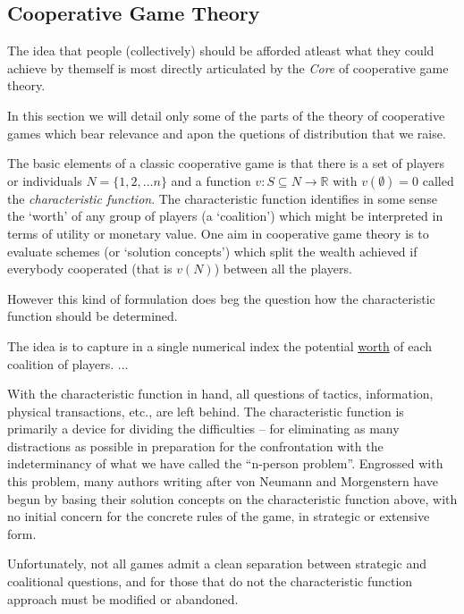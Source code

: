 \subsection{Cooperative Game Theory}\label{sec:cooperative_game_theory_part}

The idea that people (collectively) should be afforded atleast what they could achieve by themself is most directly articulated by the \textit{Core} of cooperative game theory.

In this section we will detail only some of the parts of the theory of cooperative games which bear relevance and apon the quetions of distribution that we raise.

The basic elements of a classic cooperative game is that there is a set of players or individuals $N=\{1,2,\dots n\}$ and a function $v: S\subseteq N \rightarrow \mathbb{R}$ with $v(\emptyset)=0$ called the \textit{characteristic function}.
The characteristic function identifies in some sense the `worth' of any group of players (a `coalition') which might be interpreted in terms of utility or monetary value.
One aim in cooperative game theory is to evaluate schemes (or `solution concepts') which split the wealth achieved if everybody cooperated (that is $v(N)$) between all the players.

However this kind of formulation does beg the question how the characteristic function should be determined.

\begin{displayquote}
The idea is to capture in a single numerical index the potential \underline{worth} of each coalition of players.
...

With the characteristic function in hand, all questions of tactics, information, physical transactions, etc., are left behind. The characteristic function is primarily a device for dividing the difficulties -- for eliminating as many distractions as possible in preparation for the confrontation with the indeterminancy of what we have called the ``n-person problem''. Engrossed with this problem, many authors writing after von Neumann and Morgenstern have begun by basing their solution concepts on the characteristic function above, with no initial concern for the concrete rules of the game, in strategic or extensive form.

Unfortunately, not all games admit a clean separation between strategic and coalitional questions, and for those that do not the characteristic function approach must be modified or abandoned.\cite{ShapleySchubikCharacteristicFunction}
\end{displayquote}

